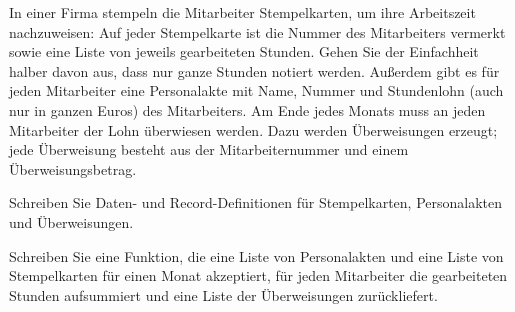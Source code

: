\begin{aufgabe}
   In einer Firma stempeln die Mitarbeiter Stempelkarten, um ihre
  Arbeitszeit nachzuweisen: Auf jeder Stempelkarte ist die Nummer des
  Mitarbeiters vermerkt sowie eine Liste von jeweils gearbeiteten
  Stunden. Gehen Sie der Einfachheit halber davon aus, dass nur ganze Stunden
  notiert werden.
  Außerdem gibt es für jeden Mitarbeiter eine Personalakte
  mit Name, Nummer und Stundenlohn (auch nur in ganzen Euros) des Mitarbeiters.
  Am Ende jedes Monats 
  muss an jeden Mitarbeiter der Lohn überwiesen werden.  Dazu werden
  Überweisungen erzeugt; jede Überweisung besteht aus der
  Mitarbeiternummer und einem Überweisungsbetrag.

  Schreiben Sie Daten- und Record-Definitionen für Stempelkarten,
  Personalakten und Überweisungen.

  Schreiben Sie eine Funktion, die eine Liste von Personalakten
  und eine Liste von Stempelkarten für einen Monat akzeptiert, für jeden
  Mitarbeiter die gearbeiteten Stunden aufsummiert und eine
  Liste der Überweisungen zurückliefert.
\end{aufgabe}

